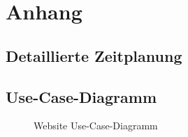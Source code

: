 \section{Anhang}
\subsection{Detaillierte Zeitplanung}
\label{app:Zeitplanung}



\clearpage


\clearpage

\subsection{Use-Case-Diagramm}
\label{app:UseCase}
\begin{figure}[htb]
\centering
{}
\caption{Website Use-Case-Diagramm}
\end{figure}
\clearpage






\clearpage

\clearpage

\clearpage

%
%

%


%
